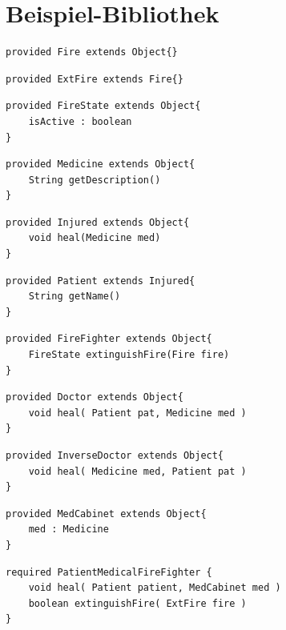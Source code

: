 \documentclass[a4paper,12pt]{article}
\begin{document}
\section{Beispiel-Bibliothek}



\begin{lstlisting}[style = dsl]
provided Fire extends Object{}
\end{lstlisting}

\begin{lstlisting}[style = dsl]
provided ExtFire extends Fire{}
\end{lstlisting}


\begin{lstlisting}[style = dsl]
provided FireState extends Object{
	isActive : boolean
}
\end{lstlisting}

\begin{lstlisting}[style = dsl]
provided Medicine extends Object{
	String getDescription()
}
\end{lstlisting}

\begin{lstlisting}[style = dsl]
provided Injured extends Object{
	void heal(Medicine med)	
}
\end{lstlisting}


\begin{lstlisting}[style = dsl]
provided Patient extends Injured{
	String getName()
}
\end{lstlisting}
\begin{lstlisting}[style = dsl]
provided FireFighter extends Object{
	FireState extinguishFire(Fire fire)
}
\end{lstlisting}

\begin{lstlisting}[style = dsl]
provided Doctor extends Object{	
	void heal( Patient pat, Medicine med )
}
\end{lstlisting}


\begin{lstlisting}[style = dsl]
provided InverseDoctor extends Object{	
	void heal( Medicine med, Patient pat )
}
\end{lstlisting}

\begin{lstlisting}[style = dsl]
provided MedCabinet extends Object{
	med : Medicine
}
\end{lstlisting}

\begin{lstlisting}[style = dsl]
required PatientMedicalFireFighter {
	void heal( Patient patient, MedCabinet med )
	boolean extinguishFire( ExtFire fire )	
}
\end{lstlisting}
\end{document}
